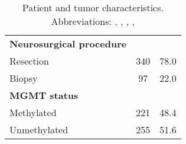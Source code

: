 \begin{table}
\begin{tabular}{L{5cm} S[table-number-alignment=center-decimal-marker, table-format=3.0] S[table-number-alignment=center-decimal-marker, table-format=3.1]}
    \textbf{Neurosurgical procedure}\\
    \hspace{1em}Resection & 340 & 78.0\\
    \hspace{1em}Biopsy & 97 & 22.0\\

    \textbf{\acrshort{MGMT} status}\\
    \hspace{1em} Methylated & 221 & 48.4\\
    \hspace{1em} Unmethylated & 255 & 51.6\\
    \bottomrule
\end{tabular}
\caption{Patient and \gls{tumor} characteristics. Abbreviations: , , , , }\label{tab:HGG_location_characteristics}
\end{table}


